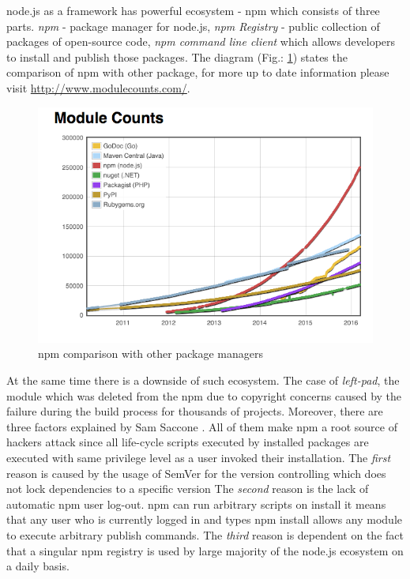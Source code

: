 node.js as a framework has powerful ecosystem - npm which consists of three parts. \textit{npm} - package manager for node.js, \textit{npm Registry} - public collection of packages of open-source code, \textit{npm command line client} which allows developers to install and publish those packages. The diagram (Fig.: \ref{fig:npmStat}) states the comparison of npm with other package, for more up to date information please visit \url{http://www.modulecounts.com/}.
\begin{figure}[ht]
	\label{fig:npmStat}
	\centering
	\includegraphics[width=\textwidth]{grafiken/modulecounts.png}
	\caption{npm comparison with other package managers\cite{moduleCounts}}
\end{figure}

At the same time there is a downside of such ecosystem. The case of \textit{left-pad}, the module which was deleted from the npm due to copyright concerns caused by the failure during the build process for thousands of projects\cite{npmDown}. Moreover, there are three factors explained by Sam Saccone \cite{npmHydra} \cite{npmSoft}. All of them make npm a root source of hackers attack since all life-cycle scripts executed by installed packages are executed with same privilege level as a user invoked their installation. The \textit{first} reason is caused by the usage of SemVer for the version controlling which does not lock dependencies to a specific version The\textit{ second }reason is the lack of automatic npm user log-out.  npm can run arbitrary scripts on install it means that any user who is currently logged in and types npm install allows any module to execute arbitrary publish commands. The \textit{third} reason is dependent on the fact that a singular npm registry is used by large majority of the node.js ecosystem on a daily basis.

